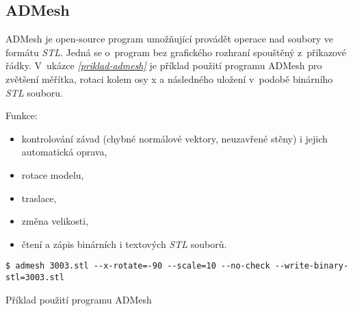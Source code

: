 \subsection{ADMesh}\label{podsekce-admesh}
ADMesh \autocite{ADMesh} je open-source program umožňující provádět operace nad soubory ve formátu \textit{\gls{STL}}. Jedná se o~program bez grafického rozhraní spouštěný z~příkazové řádky. V~ukázce \emph{\ref{priklad-admesh}} je příklad použití programu ADMesh pro zvětšení měřítka, rotaci kolem osy x a následného uložení v~podobě binárního \textit{\gls{STL}} souboru.

Funkce:
\begin{itemize}
    \item kontrolování závad (chybné normálové vektory, neuzavřené stěny) i jejich automatická oprava,
    \item rotace modelu,
    \item traslace,
    \item změna velikosti,
    \item čtení a zápis binárních i textových \textit{\gls{STL}} souborů.
\end{itemize}

\begin{listing}[htbp]
        \begin{verbatim}
$ admesh 3003.stl --x-rotate=-90 --scale=10 --no-check --write-binary-stl=3003.stl
        \end{verbatim}
    \caption{Příklad použití programu ADMesh \label{priklad-admesh}}
\end{listing}
